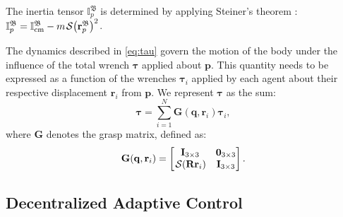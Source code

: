 The inertia tensor \(\mathbb{I}_p^\mathfrak{B}\) is determined by applying Steiner's theorem \citep{lemos2018analytical}: \(\mathbb{I}_p^\mathfrak{B} = \mathbb{I}_\text{cm}^\mathfrak{B} - m\SL[\mathbf{r}_p^\mathfrak{B}]^2\).

The dynamics described in \eqref{eq:tau} govern the motion of the body under the influence of the total wrench $\boldsymbol{\tau}$ applied about $\mathbf{p}$. This quantity needs to be expressed as a function of the wrenches $\boldsymbol{\tau}_i$ applied by each agent about their respective displacement $\mathbf{r}_i$ from $\mathbf{p}$. We represent $\boldsymbol{\tau}$ as the sum:
\begin{equation}
    \boldsymbol{\tau} = \sum_{i=1}^N\mathbf{G}(\mathbf{q}, \mathbf{r}_i)\boldsymbol{\tau}_i, \label{eq:tauNtauIrelation}
\end{equation}
where $\mathbf{G}$ denotes the grasp matrix, defined as:
\begin{equation}
    \mathbf{G}(\mathbf{q}, \mathbf{r}_i) = \begin{bmatrix}
        \mathbf{I}_{3\times3} & \mathbf{0}_{3\times3} \\
        \SL[\mathbf{R}\mathbf{r}_i] & \mathbf{I}_{3\times3} 
    \end{bmatrix}. \label{eq:graspmatrix}
\end{equation}

\vspace{-1mm}
\subsection{Decentralized Adaptive Control}
\vspace{-1mm}

